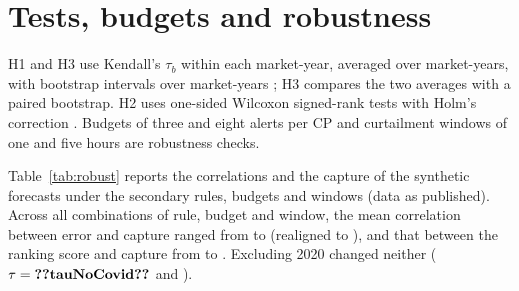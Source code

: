 \documentclass[preprint,12pt,authoryear]{elsarticle}
\begin{document}
\appendix

\section{Tests, budgets and robustness}
\label{app:robust}

H1 and H3 use Kendall's $\tau_b$ \citep{kendall1945ties} within each market-year, averaged over market-years, with bootstrap intervals over market-years \citep{efron1993bootstrap}; H3 compares the two averages with a paired bootstrap. H2 uses one-sided Wilcoxon signed-rank tests \citep{wilcoxon1945individual} with Holm's correction \citep{holm1979simple}. Budgets of three and eight alerts per CP and curtailment windows of one and five hours are robustness checks.

Table~\ref{tab:robust} reports the correlations and the capture of the synthetic forecasts under the secondary rules, budgets and windows (data as published). Across all  combinations of rule, budget and window, the mean correlation between error and capture ranged from  to  (realigned  to ), and that between the ranking score and capture from  to . Excluding 2020 changed neither ($\tau=\res{tauNoCovid}$ and ).
\end{document}
